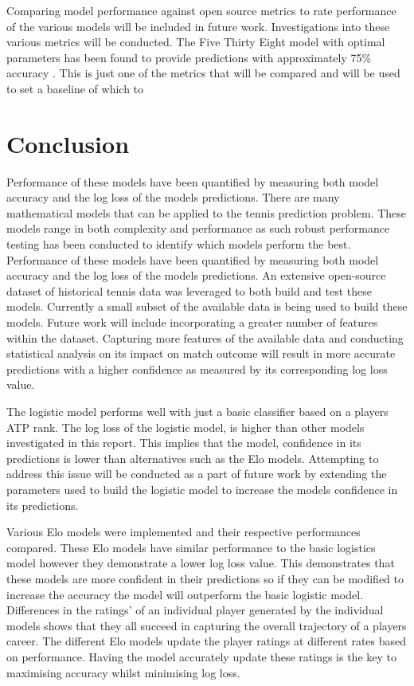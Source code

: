 \documentclass[12pt,a4paper]{article}
\begin{document}
Comparing model performance against open source metrics to rate performance of the various
models will be included in future work. Investigations into these various metrics will be
conducted. The Five Thirty Eight model with optimal parameters has been found to provide
predictions with approximately 75\% accuracy \cite{kovalchik_searching_2016}. This is just
one of the metrics that will be compared and will be used to set a baseline of which to


\clearpage

\section{Conclusion}
Performance of these models have been quantified by measuring both
model accuracy and the log loss of the models predictions. There are many mathematical models that can be applied to the tennis prediction problem.
These models range in both complexity and performance as such robust performance testing
has been conducted to identify which models perform the best. Performance of these models
have been quantified by measuring both model accuracy and the log loss of the models
predictions. An extensive open-source dataset of historical tennis data was leveraged to
both build and test these models. Currently a small subset of the available data is being
used to build these models. Future work will include incorporating a greater number of
features within the dataset. Capturing more features of the available data and conducting
statistical analysis on its impact on match outcome will result in more accurate predictions
with a higher confidence as measured by its corresponding log loss value.

The logistic model performs well with just a basic classifier based on a
players ATP rank. The log loss of the logistic model, is higher than other models
investigated in this report. This implies that the model,
confidence in its predictions is lower than alternatives such as the Elo models.
Attempting to address this issue will be conducted as a part of future work by
extending the parameters used to build the logistic model to increase the models
confidence in its predictions.

Various Elo models were implemented and their respective performances compared. These Elo
models have similar performance to the basic logistics model however they demonstrate a
lower log loss value. This demonstrates that these models are more confident in their
predictions so if they can be modified to increase the accuracy the model will outperform
the basic logistic model. Differences in the ratings' of an individual player
generated by the individual models shows that they all succeed in capturing the overall
trajectory of a players career. The different Elo models update the player ratings at
different rates based on performance. Having the model accurately update these ratings
is the key to maximising accuracy whilst minimising log loss.

\clearpage




\vspace{10mm}
\noindent \hrulefill
\end{document}

